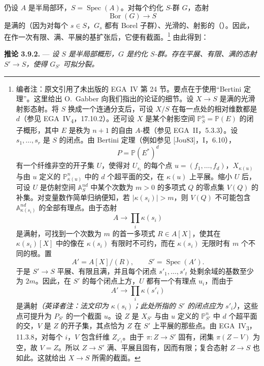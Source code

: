 仍设 \(A\) 是半局部环，\(S=\operatorname{Spec}(A)\)。对每个约化 \(S\)-群 \(G\)，态射
\[
  \operatorname{Bor}(G)\longrightarrow S
\]
是满的（因为对每个 \(s\in S\)，\(G_s\) 都有 Borel 子群）、光滑的、射影的（）。因此，在作一次有限、满、平展的基扩张后，它便有截面。\footnote{编者注：原文引用了未出版的 EGA~IV 第 24 节。要点在于使用“Bertini 定理”。这里给出 O.~Gabber 向我们指出的论证的细节。设 \(X\to S\) 是满的光滑射影态射。将 \(S\) 换成一个连通分支后，可设 \(X/S\) 在每一点处的相对维数都是 \(d\)（参见 EGA~IV\textsubscript{4}，17.10.2）。还可设 \(X\) 是某个射影空间 \(\mathbb P^n_S=\mathbb P(E)\) 的闭子概形，其中 \(E\) 是秩为 \(n+1\) 的自由 \(A\)-模（参见 EGA~II，5.3.3）。设 \(s_1,\ldots,s_r\) 是 \(S\) 的闭点。由 Bertini 定理（例如参见 \textup{[Jou83]}，I，6.10），
\[
  P=\mathbb P(E^\ast)^d
\]
有一个纤维非空的开子集 \(U\)，使得对 \(U_{s_i}\) 的每个点 \(u=(f_1,\ldots,f_d)\)，\(X_{\kappa(u)}\) 与由 \(u\) 定义的 \(\mathbb P^n_{\kappa(u)}\) 中的 \(d\) 个超平面的交，在 \(\kappa(u)\) 上平展。缩小 \(U\) 后，可设 \(U\) 是仿射空间 \(\mathbb A^{nd}_S\) 中某个次数为 \(m>0\) 的多项式 \(Q\) 的零点集 \(V(Q)\) 的补集。对变量数作简单归纳便知，若 \(\lvert\kappa(s_i)\rvert>m\)，则 \(V(Q)\) 不可能包含 \(\mathbb A^{nd}_{\kappa(s_i)}\) 的全部有理点。由于态射
\[
  A\longrightarrow\prod_i\kappa(s_i)
\]
是满射，可找到一个次数为 \(m\) 的首一多项式 \(R\in A[X]\)，使其在 \(\kappa(s_i)[X]\) 中的像在 \(\kappa(s_i)\) 有限时不可约，而在 \(\kappa(s_i)\) 无限时有 \(m\) 个不同的根。置
\[
  A'=A[X]/(R),
  \qquad
  S'=\operatorname{Spec}(A').
\]
于是 \(S'\to S\) 平展、有限且满，并且每个闭点 \(s'_1,\ldots,s'_t\) 处剩余域的基数至少为 \(2m\)。因此，在 \(S'\) 的每个闭点上方，\(U\) 都有一个有理点 \(u_i\)，而由于
\[
  A'\longrightarrow\prod_i\kappa(s'_i)
\]
是满射\emph{（英译者注：法文印为 \(\kappa(s_i)\)；此处所指的 \(S'\) 的闭点应为 \(s'_i\)）}，这些点可提升为 \(P_{S'}\) 的一个截面 \(u\)。设 \(Z\) 是 \(X_{S'}\) 与由 \(u\) 定义的 \(\mathbb P^n_{S'}\) 中 \(d\) 个超平面的交，\(V\) 是 \(Z\) 的开子集，其点恰为 \(Z\) 在 \(S'\) 上平展的那些点。由 EGA~IV\textsubscript{3}，11.3.8，对每个 \(i\)，\(V\) 包含纤维 \(Z_{s'_i}\)。由于 \(\pi:Z\to S'\) 固有，闭集 \(\pi(Z-V)\) 为空，故 \(V=Z\)。所以 \(Z\to S'\) 满、平展且固有，因而有限；复合态射 \(Z\to S\) 也如此。这就给出 \(X\to S\) 所需的截面。}
由此得到：

\medskip\noindent\textbf{推论 3.9.2.} ---
{\itshape 设 \(S\) 是半局部概形，\(G\) 是约化 \(S\)-群。存在平展、有限、满的态射 \(S'\to S\)，使得 \(G_{S'}\) 可拟分裂。}

